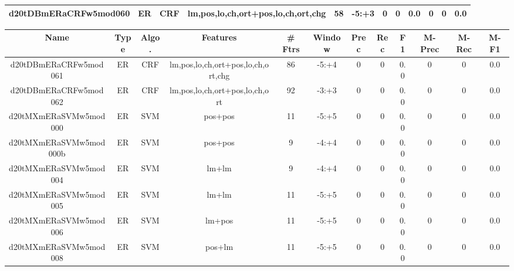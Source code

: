 \documentclass[a4paper]{article}
\begin{document}
\begin{landscape}
\begin{center}
\begin{tabular}{ |c|c|c|c|c|c|c|c|c|c|c|c|}
 
 	
 	\small{ d20tDBmERaCRFw5mod060 } & ER & CRF & lm,pos,lo,ch,ort+pos,lo,ch,ort,chg  &  58 &  -5:+3  &  0 & 0 & 0.0  &  0 & 0 & 0.0 \\
 	
 \hline
\end{tabular}
\end{center}




\begin{center}
\begin{tabular}{ |c|c|c|c|c|c|c|c|c|c|c|c|} 
 \hline
 	Name & Type & Algo. & Features & \# Ftrs & Window & Prec & Rec & F1 & M-Prec & M-Rec & M-F1\\
 \hline

 	

 
 	
 	\small{ d20tDBmERaCRFw5mod061 } & ER & CRF & lm,pos,lo,ch,ort+pos,lo,ch,ort,chg  &  86 &  -5:+4  &  0 & 0 & 0.0  &  0 & 0 & 0.0 \\
 	

 
 	
 	\small{ d20tDBmERaCRFw5mod062 } & ER & CRF & lm,pos,lo,ch,ort+pos,lo,ch,ort  &  92 &  -3:+3  &  0 & 0 & 0.0  &  0 & 0 & 0.0 \\
 	

 
 	
 	\small{ d20tMXmERaSVMw5mod000 } & ER & SVM & pos+pos  &  11 &  -5:+5  &  0 & 0 & 0.0  &  0 & 0 & 0.0 \\
 	

 
 	
 	\small{ d20tMXmERaSVMw5mod000b } & ER & SVM & pos+pos  &  9 &  -4:+4  &  0 & 0 & 0.0  &  0 & 0 & 0.0 \\
 	

 
 	
 	\small{ d20tMXmERaSVMw5mod004 } & ER & SVM & lm+lm  &  9 &  -4:+4  &  0 & 0 & 0.0  &  0 & 0 & 0.0 \\
 	

 
 	
 	\small{ d20tMXmERaSVMw5mod005 } & ER & SVM & lm+lm  &  11 &  -5:+5  &  0 & 0 & 0.0  &  0 & 0 & 0.0 \\
 	

 
 	
 	\small{ d20tMXmERaSVMw5mod006 } & ER & SVM & lm+pos  &  11 &  -5:+5  &  0 & 0 & 0.0  &  0 & 0 & 0.0 \\
 	

 
 	
 	\small{ d20tMXmERaSVMw5mod008 } & ER & SVM & pos+lm  &  11 &  -5:+5  &  0 & 0 & 0.0  &  0 & 0 & 0.0 \\
 	


\end{tabular}
\end{center}
\end{landscape}
\end{document}
